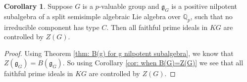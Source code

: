 \documentclass[12pt,a4paper]{article}
\let\\=\cr
\theoremstyle{definition}
\newtheorem{cor}[thm]{Corollary}
\theoremstyle{remark}
\newtheorem{rk}[thm]{Remark}
\newtheorem{ex}[thm]{Example}
\theoremstyle{custthm}
\begin{document}
\begin{cor}\label{cor: new cases}
Suppose $G$ is a $p$-valuable group and $\mathfrak{g}_G$ is a positive nilpotent subalgebra of a split semisimple algebraic Lie algebra over $\mathbb{Q}_p$, such that no irreducible component has type $C$. Then all faithful prime ideals in $KG$ are controlled by $Z(G)$.
\end{cor}

\begin{proof}
Using Theorem \ref{thm: B(g) for g nilpotent subalgebra}, we know that $Z(\mathfrak{g}_G)=B(\mathfrak{g}_G)$. So using Corollary \ref{cor: when B(G)=Z(G)} we see that all faithful prime ideals in $KG$ are controlled by $Z(G)$.\end{proof}




\end{document}
